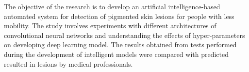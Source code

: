 The objective of the research is to develop an artificial intelligence-based automated system for detection of pigmented skin lesions for people with less mobility. 
The study involves experiments with different architectures of convolutional neural networks and understanding the effects of hyper-parameters on developing deep learning model. 
The results obtained from tests performed during the development of intelligent models were compared with predicted resulted in lesions by medical professionals.
